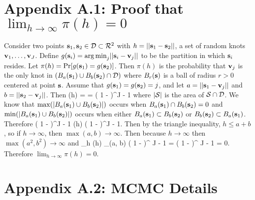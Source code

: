 \documentclass[11pt]{article}
\begin{document}
\section*{Appendix A.1: Proof that $\lim_{h \rightarrow \infty} \pi(h) = 0$}
Consider two points $\mbox{\bf s}_1, \mbox{\bf s}_2 \in {\cal D} \subset {\cal R}^2$ with $h = || \mbox{\bf s}_1 - \mbox{\bf s}_2 ||$, a set of random knots $\mbox{\bf v}_1, \ldots, \mbox{\bf v}_J$.
Define $g(\mbox{\bf s}_i) = {\mathop{\rm arg\, min}}_j ||\mbox{\bf s}_i - \mbox{\bf v}_j ||$ to be the partition in which $\mbox{\bf s}_i$ resides. 
Let $\pi(h) = \Pr[ g(\mbox{\bf s}_1) = g(\mbox{\bf s}_2) ]$. Then $\pi(h)$ is the probability that $\mbox{\bf v}_j$ is the only knot in $(B_a(\mbox{\bf s}_1) \cup B_b(\mbox{\bf s}_2) \cap {\cal D})$ where $B_r(\mbox{\bf s})$ is a ball of radius $r > 0$ centered at point $\mbox{\bf s}$.
Assume that $g(\mbox{\bf s}_1) = g(\mbox{\bf s}_2) = j$, and let $a = ||\mbox{\bf s}_1 - \mbox{\bf v}_j ||$ and $b = ||\mbox{\bf s}_2 - \mbox{\bf v}_j ||$. 
Then
\beqn
	\pi(h) = \Pr{} = \left( 1 - \frac{ | \ballunion | }{ | \calD |} \right)^{J - 1}
\eeqn
where $| {\cal S} |$ is the area of ${\cal S} \cap {\cal D}$.
We know that $\max( |B_a(\mbox{\bf s}_1) \cup B_b(\mbox{\bf s}_2) |)$ occurs when $B_a(\mbox{\bf s}_1) \cap B_b(\mbox{\bf s}_2) = 0$ and $\min( | B_a(\mbox{\bf s}_1) \cup B_b(\mbox{\bf s}_2) | )$ occurs when either $B_a(\mbox{\bf s}_1) \subset B_b(\mbox{\bf s}_2)$ or $B_b(\mbox{\bf s}_2) \subset B_a(\mbox{\bf s}_1)$.
Therefore
\beqn
	\left( 1 -  \right)^{J - 1} \le \pi(h) \le \left( 1 -  \right)^{J - 1}.
\eeqn
Then by the triangle inequality, $h \le a + b$, so if $h \rightarrow \infty$, then $\max(a, b) \rightarrow \infty$.
Then because $h \rightarrow \infty$ then $\max(a^2, b^2) \rightarrow \infty$ and 
\beqn
	\lim_{h \rightarrow \infty} \pi(h) \le \lim_{\max(a, b) \rightarrow \infty} \left( 1 - \right)^{ J - 1 } = \left( 1 - \frac{ | \calD |}{ | \calD |} \right)^{ J - 1 } = 0.
\eeqn
Therefore $\lim_{h \rightarrow \infty} \pi(h) = 0$.

\section*{Appendix A.2: MCMC Details}
\end{document}
